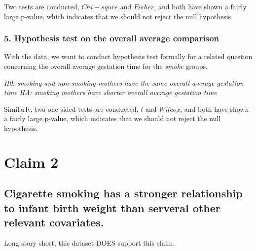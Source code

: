 \documentclass{article}
\begin{document}
Two tests are conducted, $Chi-squre$ and $Fisher$, and both have shown a
fairly large p-value, which indicates that we should not reject the
null hypothesis.


\subsubsection*{5. Hypothesis test on the overall average comparison}
\hspace{12 pt} With the data, we want to conduct
hypothesis test formally for a related question concerning the overall
average gestation time for the \textit{smoke} groups. \newline


\hspace{12 pt} \textit{H0: smoking and non-smoking mothers have the same overall average gestation time} \newline
\vspace{2 pt}
\hspace{24 pt} \textit{HA: smoking mothers have shorter overall average gestation time} \newline


Similarly, two one-sided tests are conducted, $t$ and $Wilcox$, and both have shown a
fairly large p-value, which indicates that we should not reject the
null hypothesis.





\newpage
\section*{Claim 2}
\subsection*{Cigarette smoking has a stronger relationship to infant
  birth weight than serveral other relevant covariates.}

\hspace{12 pt} Long story short, this dataset DOES support this claim.
\end{document}
